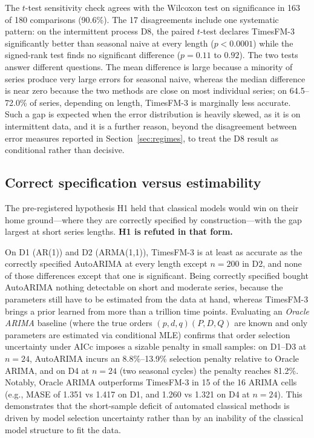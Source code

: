 \documentclass[article]{ajs}
\providecommand{\sectionref}[1]{Section~\ref{#1}}
\begin{document}
The $t$-test sensitivity check agrees with the Wilcoxon test on significance in 163 of 180
comparisons (90.6\%). The 17 disagreements include one systematic pattern: on the intermittent process D8, the paired $t$-test declares TimesFM-3 significantly
better than seasonal naive at every length ($p < 0.0001$) while the signed-rank test finds no
significant difference ($p = 0.11$ to $0.92$). The two tests answer different questions. The mean difference is large because a minority of
series produce very large errors for seasonal naive, whereas the median difference is near zero
because the two methods are close on most individual series; on 64.5--72.0\% of series, depending on
length, TimesFM-3 is marginally less accurate. Such a gap is expected when the error distribution
is heavily skewed, as it is on intermittent data, and it is a further reason, beyond the
disagreement between error measures reported in \sectionref{sec:regimes}, to treat the D8 result
as conditional rather than decisive.

\subsection{Correct specification versus estimability}
\label{sec:estimability}

The pre-registered hypothesis H1 held that classical models would win on their home
ground---where they are correctly specified by construction---with the gap largest at short
series lengths. \textbf{H1 is refuted in that form.}

On D1 (AR(1)) and D2 (ARMA(1,1)), TimesFM-3 is at least as accurate as the correctly specified
AutoARIMA at every length except $n = 200$ in D2, and none of those differences except that one
is significant. Being correctly specified bought AutoARIMA nothing detectable on short and
moderate series, because the parameters still have to be estimated from the data at hand,
whereas TimesFM-3 brings a prior learned from more than a trillion time points.
Evaluating an \emph{Oracle ARIMA} baseline (where the true orders $(p,d,q)(P,D,Q)$ are known
and only parameters are estimated via conditional MLE) confirms that order selection uncertainty
under AICc imposes a sizable penalty in small samples: on D1--D3 at $n = 24$, AutoARIMA incurs an
8.8\%--13.9\% selection penalty relative to Oracle ARIMA, and on D4 at $n = 24$ (two seasonal cycles)
the penalty reaches 81.2\%. Notably, Oracle ARIMA outperforms TimesFM-3 in 15 of the 16 ARIMA cells
(e.g., MASE of 1.351 vs 1.417 on D1, and 1.260 vs 1.321 on D4 at $n = 24$). This demonstrates that
the short-sample deficit of automated classical methods is driven by model selection uncertainty
rather than by an inability of the classical model structure to fit the data.
\end{document}
